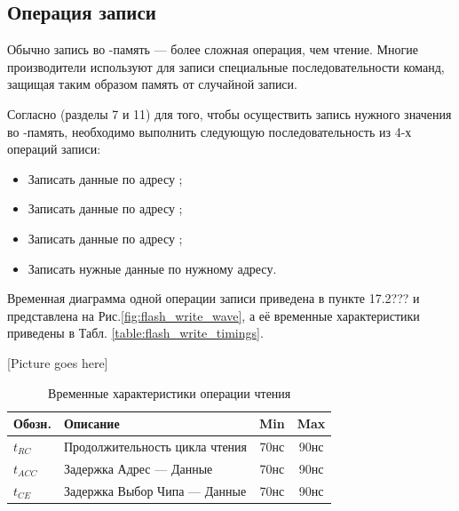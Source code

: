 \subsection{Операция записи}
\par{Обычно запись во -память --- более сложная операция, чем чтение. Многие производители используют для записи специальные последовательности команд, защищая таким образом память от случайной записи.}
\par{Согласно  (разделы 7 и 11) для того, чтобы осуществить запись нужного значения во -память, необходимо выполнить следующую последовательность из 4-х операций записи:
\begin{itemize}[noitemsep, label={}]
  \item Записать данные  по адресу ;
  \item Записать данные  по адресу ;
  \item Записать данные  по адресу ;
  \item Записать нужные данные по нужному адресу.
\end{itemize}
}
\par{Временная диаграмма одной операции записи приведена в пункте 17.2???  и представлена на Рис.\ref{fig:flash_write_wave}, а её временные характеристики приведены в Табл. \ref{table:flash_write_timings}.}

\par{[Picture goes here]}
% 


\begin{table}[htbp]
  \centering
  \small
  \begin{tabular}{l|l|c|c}
    Обозн. & Описание & Min & Max \\
    \hline
    $t_{RC}$ & Продолжительность цикла чтения & 70нс & 90нс\\
    $t_{ACC}$ & Задержка Адрес --- Данные & 70нс & 90нс\\
    $t_{CE}$ & Задержка Выбор Чипа --- Данные & 70нс & 90нс\\
  \end{tabular}
  \caption{Временные характеристики операции чтения }
  \label{table:flash_read_timings}
\end{table}

